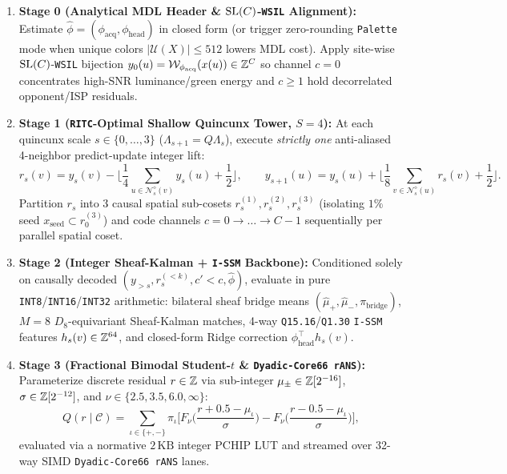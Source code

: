\begin{enumerate}
  \item \textbf{Stage 0 (Analytical MDL Header \& $\mathrm{SL}(C)$-\texttt{WSIL} Alignment):} Estimate $\hat{\phi} = (\phi_{\mathrm{acq}},\phi_{\mathrm{head}})$ in closed form (or trigger zero-rounding \texttt{Palette} mode when unique colors $|\mathcal{U}(X)| \le 512$ lowers MDL cost). Apply site-wise $\mathrm{SL}(C)$-\texttt{WSIL} bijection $y_0(u) = \mathcal{W}_{\phi_{\mathrm{acq}}}(x(u)) \in \mathbb{Z}^C$ so channel $c=0$ concentrates high-SNR luminance/green energy and $c \ge 1$ hold decorrelated opponent/ISP residuals.
  \item \textbf{Stage 1 (\texttt{RITC}-Optimal Shallow Quincunx Tower, $S=4$):} At each quincunx scale $s \in \{0,\dots,3\}$ ($\Lambda_{s+1} = Q\Lambda_s$), execute \emph{strictly one} anti-aliased 4-neighbor predict-update integer lift:
  \begin{equation}
    r_s(v) = y_s(v) - \Big\lfloor \frac{1}{4}\!\sum_{u \in \mathcal{N}_s^\diamond(v)}\! y_s(u) + \frac{1}{2}\Big\rfloor, \qquad
    y_{s+1}(u) = y_s(u) + \Big\lfloor \frac{1}{8}\!\sum_{v \in \mathcal{N}_s^\diamond(u)}\! r_s(v) + \frac{1}{2}\Big\rfloor.
    \label{eq:quincunx-lift}
  \end{equation}
  Partition $r_s$ into 3 causal spatial sub-cosets $r_s^{(1)}, r_s^{(2)}, r_s^{(3)}$ (isolating $1\%$ seed $x_{\mathrm{seed}} \subset r_0^{(3)}$) and code channels $c = 0 \to \dots \to C-1$ sequentially per parallel spatial coset.
  \item \textbf{Stage 2 (Integer Sheaf-Kalman + \texttt{I-SSM} Backbone):} Conditioned solely on causally decoded $(y_{>s}, r_s^{(<k)}, c'<c, \hat{\phi})$, evaluate in pure \texttt{INT8}/\texttt{INT16}/\texttt{INT32} arithmetic: bilateral sheaf bridge means $(\hat{\mu}_+, \hat{\mu}_-, \pi_{\mathrm{bridge}})$, $M=8$ $D_8$-equivariant Sheaf-Kalman matches, 4-way \texttt{Q15.16}/\texttt{Q1.30} \texttt{I-SSM} features $h_s(v) \in \mathbb{Z}^{64}$, and closed-form Ridge correction $\phi_{\mathrm{head}}^\top h_s(v)$.
  \item \textbf{Stage 3 (Fractional Bimodal Student-$t$ \& \texttt{Dyadic-Core66 rANS}):} Parameterize discrete residual $r \in \mathbb{Z}$ via sub-integer $\mu_\pm \in \mathbb{Z}[2^{-16}]$, $\sigma \in \mathbb{Z}[2^{-12}]$, and $\nu \in \{2.5, 3.5, 6.0, \infty\}$:
  \begin{equation}
    Q(r \mid \mathcal{C}) = \sum_{\iota \in \{+,-\}} \pi_\iota \Big[F_\nu\!\Big(\frac{r + 0.5 - \mu_\iota}{\sigma}\Big) - F_\nu\!\Big(\frac{r - 0.5 - \mu_\iota}{\sigma}\Big)\Big],
  \end{equation}
  evaluated via a normative $2\,\mathrm{KB}$ integer PCHIP LUT and streamed over 32-way SIMD \texttt{Dyadic-Core66 rANS} lanes.
\end{enumerate}

